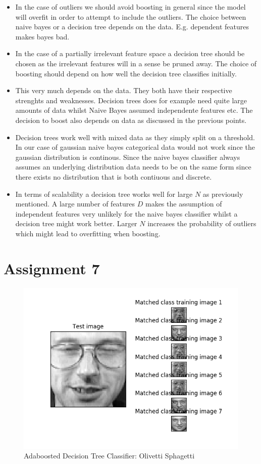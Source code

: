 \documentclass{article}
\begin{document}

\begin{itemize}

\item In the case of outliers we should avoid boosting in general since the model will overfit in order to attempt to include the outliers. The choice between naive bayes or a decision tree depends on the data. E.g. dependent features makes bayes bad.

\item In the case of a partially irrelevant feature space a decision tree should be chosen as the irrelevant features will in a sense be pruned away. The choice of boosting should depend on how well the decision tree classifies initially.

\item This very much depends on the data. They both have their respective strenghts and weaknesses. Decision trees does for example need quite large amounts of data whilst Naive Bayes assumed independente features etc. The decision to boost also depends on data as discussed in the previous points.

\item Decision trees work well with mixed data as they simply split on a threshold. In our case of gaussian naive bayes categorical data would not work since the gaussian distribution is continous. Since the naive bayes classifier always assumes an underlying distribution data needs to be on the same form since there exists no distribution that is both contiuous and discrete.

\item In terms of scalability a decision tree works well for large $N$ as previously mentioned. A large number of features $D$ makes the assumption of independent features very unlikely for the naive bayes classifier whilst a decision tree might work better. Larger $N$ increases the probability of outliers which might lead to overfitting when boosting.

\end{itemize}

\section*{Assignment 7}

\begin{figure}
    \centering
    \includegraphics[scale = 0.90]{Olivetti.png}
    \caption{Adaboosted Decision Tree Classifier: Olivetti Sphagetti}
\end{figure}
\end{document}
